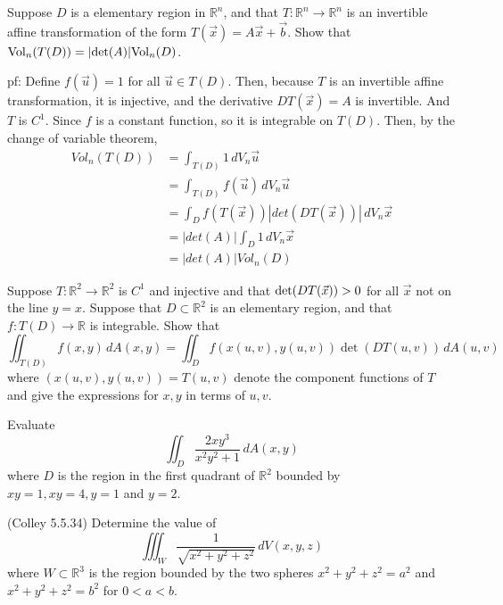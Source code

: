 \documentclass[11pt,letterpaper,cm]{nupset}
\begin{document}
\begin{problem}[Exercise 6]
	Suppose $D$ is a elementary region in $\mathbb{R}^n$, and that $T: \mathbb{R}^n \to \mathbb{R}^n$ is an invertible affine transformation of the form $T(\vec{x}) = A\vec{x}+\vec{b}$. Show that ${\rm Vol}_n(T(D)) = |{\rm det}(A)|{\rm Vol}_n(D)$.
\end{problem}
\begin{solution}
	pf: Define $f(\vec{u})=1$ for all $\vec{u}\in T(D)$. Then, because $T$ is an invertible affine transformation, it is injective, and the derivative $DT(\vec{x})=A$ is invertible. And $T$ is $C^1$. Since $f$ is a constant function, so it is integrable on $T(D)$. Then, by the change of variable theorem,
	\begin{align*}
		Vol_n(T(D))&=\int_{T(D)} 1\,dV_n\vec{u}\\
		&=\int_{T(D)} f(\vec{u})\,dV_n\vec{u}\\
		&=\int_{D} f(T(\vec{x}))|det(DT(\vec{x}))|\,dV_n\vec{x}\\
		&=|det(A)|\int_{D} 1\,dV_n\vec{x}\\
		&=|det(A)|Vol_n(D)
	\end{align*}
\end{solution}
\newpage

\begin{problem}[Exercise 7] 
	Suppose $T: \mathbb{R}^2 \to \mathbb{R}^2$ is $C^1$ and injective and that ${\rm det}(DT(\vec{x}))>0$ for all $\vec{x}$ not on the line $y=x$. Suppose that $D\subset\mathbb{R}^2$ is an elementary region, and that $f:T(D) \to \mathbb{R}$ is integrable. Show that
\[ \iint_{T(D)} f(x,y)\,dA(x,y) = \iint_D f(x(u,v),y(u,v))\det(DT(u,v))\,dA(u,v) \]
where $(x(u,v),y(u,v)) = T(u,v)$ denote the component functions of $T$ and give the expressions for $x,y$ in terms of $u,v$.
\end{problem}
\begin{solution}
\end{solution}
\newpage

\begin{problem}[Exercise 8]
	Evaluate
	\[ \iint_D \frac{2xy^3}{x^2y^2+1}\,dA(x,y) \]
	where $D$ is the region in  the first quadrant of $\mathbb{R}^2$ bounded by $xy=1, xy=4, y=1$ and $y=2$.
\end{problem}
\begin{solution}
\end{solution}
\newpage

\begin{problem}[Exercise 9] (Colley 5.5.34)  Determine the value of $$\iiint_W \frac{1}{\sqrt{x^2+y^2+z^2}}\,dV(x,y,z)$$ where $W\subset\mathbb{R}^3$ is the region bounded by the two spheres $x^2+y^2+z^2=a^2$ and $x^2+y^2+z^2=b^2$ for $0<a<b$.
\end{problem}
\begin{solution}
\end{solution}
\newpage
\end{document}
